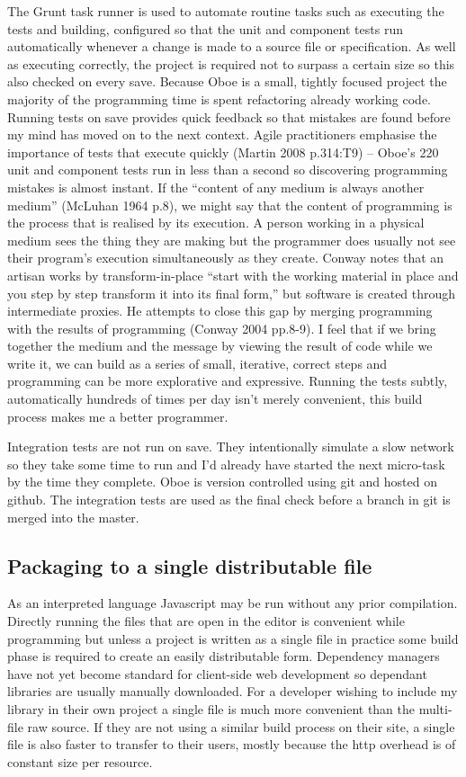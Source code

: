\documentclass[12pt, ]{article}
\begin{document}
The Grunt task runner is used to automate routine tasks such as
executing the tests and building, configured so that the unit and
component tests run automatically whenever a change is made to a source
file or specification. As well as executing correctly, the project is
required not to surpass a certain size so this also checked on every
save. Because Oboe is a small, tightly focused project the majority of
the programming time is spent refactoring already working code. Running
tests on save provides quick feedback so that mistakes are found before
my mind has moved on to the next context. Agile practitioners emphasise
the importance of tests that execute quickly (Martin 2008 p.314:T9) --
Oboe's 220 unit and component tests run in less than a second so
discovering programming mistakes is almost instant. If the ``content of
any medium is always another medium'' (McLuhan 1964 p.8), we might say
that the content of programming is the process that is realised by its
execution. A person working in a physical medium sees the thing they are
making but the programmer does usually not see their program's execution
simultaneously as they create. Conway notes that an artisan works by
transform-in-place ``start with the working material in place and you
step by step transform it into its final form,'' but software is created
through intermediate proxies. He attempts to close this gap by merging
programming with the results of programming (Conway 2004 pp.8-9). I feel
that if we bring together the medium and the message by viewing the
result of code while we write it, we can build as a series of small,
iterative, correct steps and programming can be more explorative and
expressive. Running the tests subtly, automatically hundreds of times
per day isn't merely convenient, this build process makes me a better
programmer.

Integration tests are not run on save. They intentionally simulate a
slow network so they take some time to run and I'd already have started
the next micro-task by the time they complete. Oboe is version
controlled using git and hosted on github. The integration tests are
used as the final check before a branch in git is merged into the
master.

\subsection{Packaging to a single distributable
file}\label{packaging-to-a-single-distributable-file}

As an interpreted language Javascript may be run without any prior
compilation. Directly running the files that are open in the editor is
convenient while programming but unless a project is written as a single
file in practice some build phase is required to create an easily
distributable form. Dependency managers have not yet become standard for
client-side web development so dependant libraries are usually manually
downloaded. For a developer wishing to include my library in their own
project a single file is much more convenient than the multi-file raw
source. If they are not using a similar build process on their site, a
single file is also faster to transfer to their users, mostly because
the http overhead is of constant size per resource.
\end{document}
